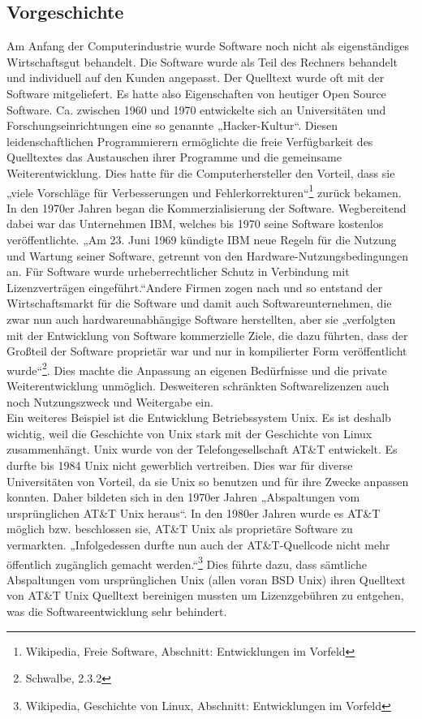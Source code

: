 \documentclass[a4paper,12pt]{article}
\begin{document}
\subsection{Vorgeschichte}
Am Anfang der Computerindustrie wurde Software noch nicht als eigenständiges Wirtschaftsgut behandelt. Die Software wurde als Teil des Rechners behandelt und individuell auf den Kunden angepasst. Der Quelltext wurde oft mit der Software mitgeliefert. Es hatte also Eigenschaften von heutiger Open Source Software. Ca. zwischen 1960 und 1970 entwickelte sich an Universitäten und Forschungseinrichtungen eine so genannte „Hacker-Kultur“. Diesen leidenschaftlichen Programmierern ermöglichte die freie Verfügbarkeit des Quelltextes das Austauschen ihrer Programme und die gemeinsame Weiterentwicklung. Dies hatte für die Computerhersteller den Vorteil, dass sie „viele Vorschläge für Verbesserungen und Fehlerkorrekturen“\footnote{Wikipedia, Freie Software, Abschnitt: Entwicklungen im Vorfeld} zurück bekamen.\\
In den 1970er Jahren began die Kommerzialisierung der Software. Wegbereitend dabei war das Unternehmen IBM, welches bis 1970 seine Software kostenlos veröffentlichte. „Am 23. Juni 1969 kündigte IBM neue Regeln für die Nutzung und Wartung seiner Software, getrennt von den Hardware-Nutzungsbedingungen an. Für Software wurde urheberrechtlicher Schutz in Verbindung mit Lizenzverträgen eingeführt.“\footnotemark[8] Andere Firmen zogen nach und so entstand der Wirtschaftsmarkt für die Software und damit auch Softwareunternehmen, die zwar nun auch hardwareunabhängige Software herstellten, aber sie „verfolgten mit der Entwicklung von Software kommerzielle Ziele, die dazu führten, dass der Großteil der Software proprietär war und nur in kompilierter Form veröffentlicht wurde“\footnote{Schwalbe, 2.3.2}. Dies machte die Anpassung an eigenen Bedürfnisse und die private Weiterentwicklung unmöglich. Desweiteren schränkten Softwarelizenzen auch noch Nutzungszweck und Weitergabe ein.\\
Ein weiteres Beispiel ist die Entwicklung Betriebssystem Unix. Es ist deshalb wichtig, weil die Geschichte von Unix stark mit der Geschichte von Linux zusammenhängt. Unix wurde von der Telefongesellschaft AT\&T entwickelt. Es durfte bis 1984 Unix nicht gewerblich vertreiben. Dies war für diverse Universitäten von Vorteil, da sie Unix so benutzen und für ihre Zwecke anpassen konnten. Daher bildeten sich in den 1970er Jahren „Abspaltungen vom ursprünglichen AT\&T Unix heraus“\footnotemark[9]. In den 1980er Jahren wurde es AT\&T möglich bzw. beschlossen sie, AT\&T Unix als proprietäre Software zu vermarkten. „Infolgedessen durfte nun auch der AT\&T-Quellcode nicht mehr öffentlich zugänglich gemacht werden.“\footnote{Wikipedia, Geschichte von Linux, Abschnitt: Entwicklungen im Vorfeld} Dies führte dazu, dass sämtliche Abspaltungen vom ursprünglichen Unix (allen voran BSD Unix) ihren Quelltext von AT\&T Unix Quelltext bereinigen mussten um Lizenzgebühren zu entgehen, was die Softwareentwicklung sehr behindert.
\end{document}
